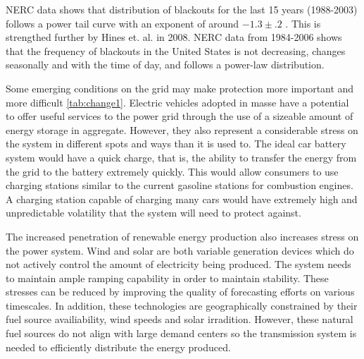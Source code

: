 \documentclass[class=report]{standalone}
\begin{document}
NERC data shows that distribution of blackouts for the last 15 years (1988-2003) follows a power tail curve with an exponent of around $-1.3\pm.2$ \cite{carreras_2004}. This is strengthed further by Hines et. al. in 2008.  NERC data from 1984-2006 shows that the frequency of blackouts in the United States is not decreasing, changes seasonally and with the time of day, and follows a power-law distribution.\cite{hines_2008} \cite{hines_2009}

Some emerging conditions on the grid may make protection more important and more difficult \ref{tab:change1}.  Electric vehicles adopted in masse have a potential to offer useful services to the power grid through the use of a sizeable amount of energy storage in aggregate.  However, they also represent a considerable stress on the system in different spots and ways than it is used to.  The ideal car battery system would have a quick charge, that is, the ability to transfer the energy from the grid to the battery extremely quickly.  This would allow consumers to use charging stations similar to the current gasoline stations for combustion engines.  A charging station capable of charging many cars would have extremely high and unpredictable volatility that the system will need to protect against.

The increased penetration of renewable energy production also increases stress on the power system.  Wind and solar are both variable generation devices which do not actively control the amount of electricity being produced.  The system needs to maintain ample ramping capability in order to maintain stability.  These stresses can be reduced by improving the quality of forecasting efforts on various timescales.  In addition, these technologies are geographically constrained by their fuel source availiability, wind speeds and solar irradition.  However, these natural fuel sources do not align with large demand centers so the transmission system is needed to efficiently distribute the energy produced.
\end{document}
